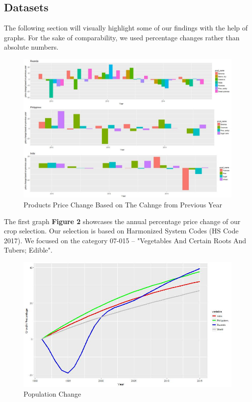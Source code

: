 \documentclass[12pt,a4paper,english]{article}
\begin{document}
\subsection{Datasets}
The following section will visually highlight some of our findings with the help of graphs. For the sake of comparability, we used percentage changes rather than absolute numbers.

\begin{figure}[!htb]
\begin{center}
\includegraphics[scale=0.50]{barplot_price_change.jpg}
\caption{Products Price Change Based on The Cahnge from Previous Year }
\label{figure2}
\end{center}
\end{figure}
The first graph \textbf{Figure 2} showcases the annual percentage price change of our crop selection.  Our selection is based on Harmonized System Codes (HS Code 2017). We focused on the category 07-015 – "Vegetables And Certain Roots And Tubers; Edible". 

\FloatBarrier
\begin{figure}[!htb]
\begin{center}
\includegraphics[scale=0.50]{population_plot.jpg}
\caption{Population Change}
\label{figure3}
\end{center}
\end{figure}
\FloatBarrier
\end{document}
